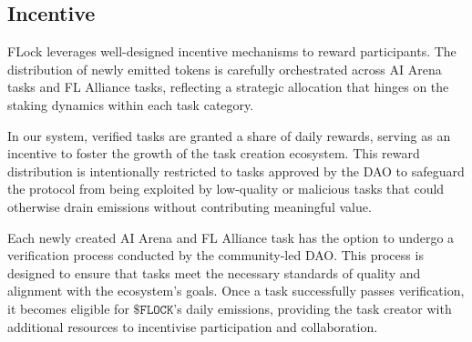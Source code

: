 \documentclass[conference]{IEEEtran}
\newcommand{\FL}{\ac{FL} Alliance\xspace}
\newcommand{\SNT}{{AI Arena}\xspace}
\newcommand{\FML}{\ensuremath{\xspace\texttt{\$FLOCK}}\xspace}
\begin{document}

\subsection{Incentive}


FLock leverages well-designed incentive mechanisms to reward participants. The distribution of newly emitted tokens is carefully orchestrated across \SNT tasks and \FL tasks, reflecting a strategic allocation that hinges on the staking dynamics within each task category. 


In our system, verified tasks are granted a share of daily rewards, serving as an incentive to foster the growth of the task creation ecosystem. This reward distribution is intentionally restricted to tasks approved by the DAO to safeguard the protocol from being exploited by low-quality or malicious tasks that could otherwise drain emissions without contributing meaningful value.

Each newly created AI Arena and FL Alliance task has the option to undergo a verification process conducted by the community-led DAO. This process is designed to ensure that tasks meet the necessary standards of quality and alignment with the ecosystem's goals. Once a task successfully passes verification, it becomes eligible for \FML's daily emissions, providing the task creator with additional resources to incentivise participation and collaboration.
\end{document}
